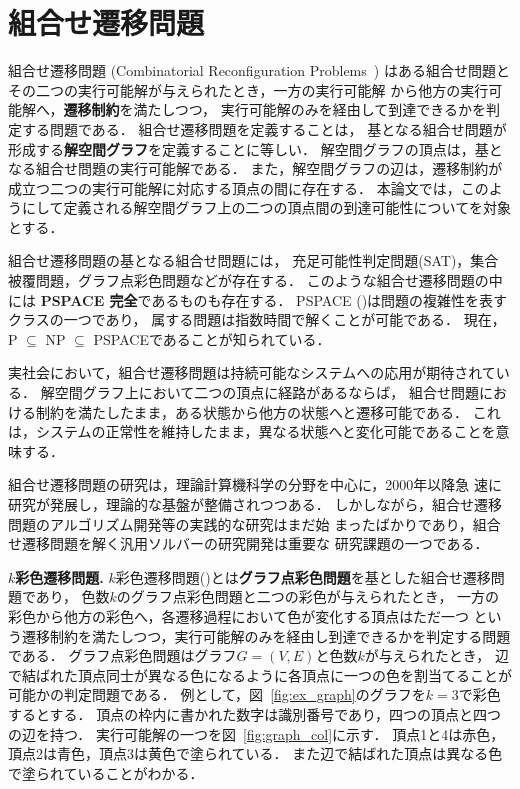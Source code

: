 \section{組合せ遷移問題} \label{chap:background}
組合せ遷移問題 (Combinatorial Reconfiguration Problems~\cite{Ito18:tohoku})
はある組合せ問題とその二つの実行可能解が与えられたとき，一方の実行可能解
から他方の実行可能解へ，\textbf{遷移制約}を満たしつつ，
実行可能解のみを経由して到達できるかを判定する問題である．
組合せ遷移問題を定義することは，
基となる組合せ問題が形成する\textbf{解空間グラフ}を定義することに等しい．
解空間グラフの頂点は，基となる組合せ問題の実行可能解である． 
また，解空間グラフの辺は，遷移制約が成立つ二つの実行可能解に対応する頂点の間に存在する．
本論文では，このようにして定義される解空間グラフ上の二つの頂点間の到達可能性についてを対象とする．

組合せ遷移問題の基となる組合せ問題には，
充足可能性判定問題(SAT)，集合被覆問題，グラフ点彩色問題などが存在する．
このような組合せ遷移問題の中には \textbf{PSPACE 完全}であるものも存在する． 
PSPACE (\cite{Kuriyama13:ieice})は問題の複雑性を表すクラスの一つであり，
属する問題は指数時間で解くことが可能である． 
現在，P $\subseteq$ NP $\subseteq$ PSPACEであることが知られている．

実社会において，組合せ遷移問題は持続可能なシステムへの応用が期待されている． 
解空間グラフ上において二つの頂点に経路があるならば，
組合せ問題における制約を満たしたまま，ある状態から他方の状態へと遷移可能である． 
これは，システムの正常性を維持したまま，異なる状態へと変化可能であることを意味する．

組合せ遷移問題の研究は，理論計算機科学の分野を中心に，2000年以降急
速に研究が発展し，理論的な基盤が整備されつつある．
しかしながら，組合せ遷移問題のアルゴリズム開発等の実践的な研究はまだ始
まったばかりであり，組合せ遷移問題を解く汎用ソルバーの研究開発は重要な
研究課題の一つである．

\textbf{$k$彩色遷移問題.}
$k$彩色遷移問題(\cite{BC2009:tcs})とは\textbf{グラフ点彩色問題}を基とした組合せ遷移問題であり， 
色数$k$のグラフ点彩色問題と二つの彩色が与えられたとき，
一方の彩色から他方の彩色へ，各遷移過程において色が変化する頂点はただ一つ
という遷移制約を満たしつつ，実行可能解のみを経由し到達できるかを判定する問題である．
グラフ点彩色問題はグラフ$G=(V, E)$と色数$k$が与えられたとき，
辺で結ばれた頂点同士が異なる色になるように各頂点に一つの色を割当てることが可能かの判定問題である． 
例として，図~\ref{fig:ex_graph}のグラフを$k=3$で彩色するとする．
頂点の枠内に書かれた数字は識別番号であり，四つの頂点と四つの辺を持つ．
実行可能解の一つを図~\ref{fig:graph_col}に示す．
頂点1と4は赤色，頂点2は青色，頂点3は黄色で塗られている．
また辺で結ばれた頂点は異なる色で塗られていることがわかる．


